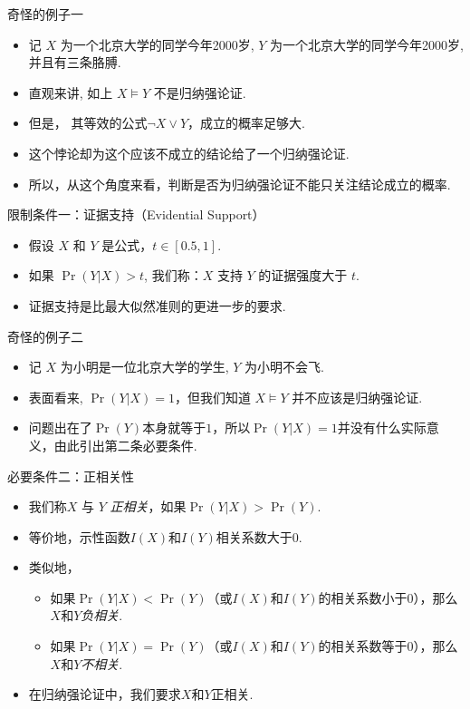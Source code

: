 	{奇怪的例子一}
	\begin{itemize}
	\item 记 $X$ 为一个北京大学的同学今年2000岁, $Y$ 为一个北京大学的同学今年2000岁,并且有三条胳膊.
	\item 直观来讲, 如上 $X\models Y$ 不是归纳强论证.
	\item 但是， 其等效的公式$\neg X\vee Y$，成立的概率足够大.
	\item 这个悖论却为这个应该不成立的结论给了一个归纳强论证.
    \item 所以，从这个角度来看，判断是否为归纳强论证不能只关注结论成立的概率.
	\end{itemize}



	{限制条件一：证据支持（Evidential Support）}
	\begin{itemize}
        \item 假设 $X$ 和 $Y$ 是公式，$t\in [0.5, 1]$.
        \item 如果 $\Pr(Y|X)>t$, 我们称：$X$ 支持 $Y$ 的证据强度大于 $t$.
        \item 证据支持是比最大似然准则的更进一步的要求.
	\end{itemize}



	{奇怪的例子二}
	\begin{itemize}
	\item 记 $X$ 为小明是一位北京大学的学生, $Y$ 为小明不会飞.
	\item 表面看来, $\Pr(Y|X)=1$，但我们知道 $X\models Y$ 并不应该是归纳强论证.
    \item 问题出在了$\Pr(Y)$本身就等于$1$，所以$\Pr(Y|X)=1$并没有什么实际意义，由此引出第二条必要条件.
	\end{itemize}



    {必要条件二：正相关性}
    \begin{itemize}
        \item 我们称$X$ 与 $Y$ \emph{正相关}，如果$\Pr(Y|X) > \Pr(Y)$.
        \item 等价地，示性函数$I(X)$和$I(Y)$相关系数大于$0$.
        \item 类似地，
        \begin{itemize}
            \item 如果$\Pr(Y|X) < \Pr(Y)$（或$I(X)$和$I(Y)$的相关系数小于$0$），那么$X$和$Y$\emph{负相关}.
            \item 如果$\Pr(Y|X) = \Pr(Y)$（或$I(X)$和$I(Y)$的相关系数等于$0$），那么$X$和$Y$\emph{不相关}.
        \end{itemize}
    \item 在归纳强论证中，我们要求$X$和$Y$正相关.
    \end{itemize}



